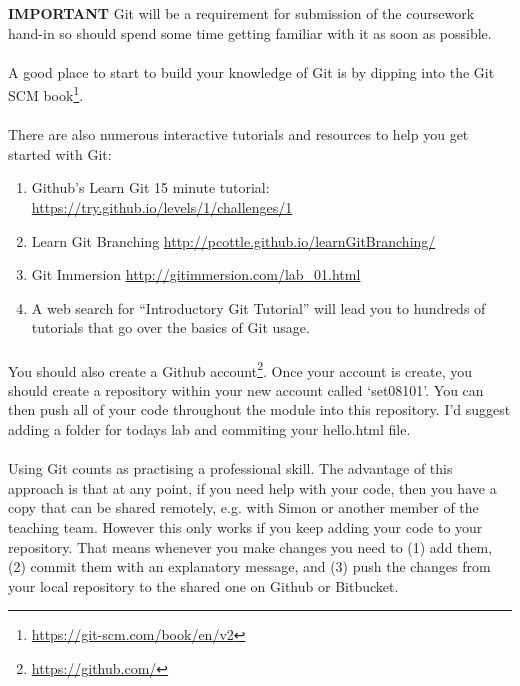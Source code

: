 \documentclass[10pt, a4paper]{article}
\begin{document}
\begin{framed}
{\textbf{IMPORTANT} Git will be a requirement for submission of the coursework hand-in so should spend some time getting familiar with it as soon as possible.}
\end{framed}

\paragraph{} A good place to start to build your knowledge of Git is by dipping into the Git SCM book\footnote{\url{https://git-scm.com/book/en/v2}}.

\paragraph{} There are also numerous interactive tutorials and resources to help you get started with Git:
\begin{enumerate}
\item Github's Learn Git 15 minute tutorial: \url{https://try.github.io/levels/1/challenges/1}
\item Learn Git Branching \url{http://pcottle.github.io/learnGitBranching/}
\item Git Immersion \url{http://gitimmersion.com/lab_01.html}
\item A web search for ``Introductory Git Tutorial'' will lead you to hundreds of tutorials that go over the basics of Git usage.
\end{enumerate}

\paragraph{} You should also create a Github account\footnote{\url{https://github.com/}}. Once your account is create, you should create a repository within your new account called `set08101'. You can then push all of your code throughout the module into this repository. I'd suggest adding a folder for todays lab and commiting your hello.html file. 

\paragraph{} Using Git counts as practising a professional skill. The advantage of this approach is that at any point, if you need help with your code, then you have a copy that can be shared remotely, e.g. with Simon or another member of the teaching team. However this only works if you keep adding your code to your repository. That means whenever you make changes you need to (1) add them, (2) commit them with an explanatory message,  and (3) push the changes from your local repository to the shared one on Github or Bitbucket.
\end{document}
